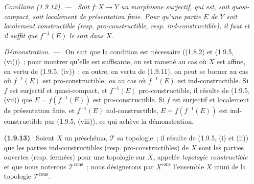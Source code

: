 \documentclass[10pt,oneside]{book}
\makeatletter
\newcommand{\setmanualcurrentlabel}[1]{\def\@currentlabel{#1}}
\newcommand{\oldpage}[2][]{%
  \setcounter{footnote}{0}%
  \marginpar{\scriptsize\textbf{#1}~|~#2}\ignorespaces}
\newenvironment{env}[1][]{\setmanualcurrentlabel{#1}\par\medskip\noindent\textbf{(#1)}\ }{\par}
\newenvironment{corollary}[1][]{%
  \setmanualcurrentlabel{#1}\par\medskip\noindent\itshape Corollaire (#1). ---\ }{\par}
\newenvironment{proof}{%
  \par\medskip\noindent\textit{Démonstration. ---\ }}{\par}
\makeatother
\begin{document}
\begin{corollary}[1.9.12]
\label{IV.1.9.12-fr}
Soit $f:X\to Y$ un morphisme surjectif, qui est, soit quasi-compact, soit
localement de présentation finie. Pour qu'une partie $E$ de $Y$ soit
localement constructible (resp. pro-constructible, resp. ind-constructible),
il faut et il suffit que $f^{-1}(E)$ le soit dans $X$.
\end{corollary}

\oldpage[IV-1]{247}

\begin{proof}
On sait que la condition est nécessaire ((1.8.2) et (1.9.5, (vi)))~; pour
montrer qu'elle est suffisante, on est ramené au cas où $X$ est affine, en
vertu de (1.9.5, (iv))~; en outre, en vertu de (1.9.11), on peut se borner au
cas où $f^{-1}(E)$ est pro-constructible, \emph{ou} au cas où $f^{-1}(E)$ est
ind-constructible. Si $f$ est surjectif et quasi-compact, et $f^{-1}(E)$
pro-constructible, il résulte de (1.9.5, (vii)) que
$E=f(f^{-1}(E))$ est pro-constructible. Si $f$ est surjectif et localement de
présentation finie, et $f^{-1}(E)$ ind-constructible,
$E=f(f^{-1}(E))$ est ind-constructible par (1.9.5, (viii)), ce qui achève la
démonstration.
\end{proof}

\begin{env}[1.9.13]
\label{IV.1.9.13-fr}
Soient $X$ un préschéma, $\mathscr T$ sa topologie~; il résulte de (1.9.5,
(i) et (ii)) que les parties ind-constructibles (resp. pro-constructibles) de
$X$ sont les parties ouvertes (resp. fermées) pour une topologie sur $X$,
appelée \emph{topologie constructible} et que nous noterons
$\mathscr T^{\mathrm{cons}}$~; nous désignerons par $X^{\mathrm{cons}}$
l'ensemble $X$ muni de la topologie $\mathscr T^{\mathrm{cons}}$.
\end{env}
\end{document}
